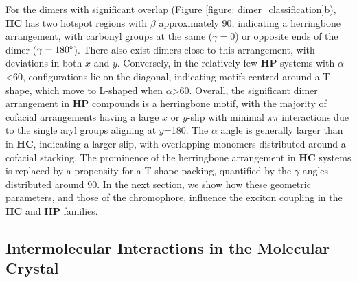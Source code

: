 For the dimers with significant overlap (Figure \ref{figure: dimer_classification}b), \textbf{HC} has two hotspot regions with $\beta$ approximately 90\degree, indicating a herringbone arrangement, with carbonyl groups at the same ($\gamma=$0\degree) or opposite ends of the dimer ($\gamma=180\degree$). There also exist dimers close to this arrangement, with deviations in both $x$ and $y$. Conversely, in the relatively few \textbf{HP} systems with  $\alpha$\textless{60}, configurations lie on the diagonal, indicating motifs centred around a T-shape, which move to L-shaped when $\alpha$\textgreater{60}. Overall, the significant dimer arrangement in \textbf{HP} compounds is a herringbone motif, with the majority of cofacial arrangements having a large $x$ or $y$-slip with minimal $\pi\pi$ interactions due to the single aryl groups aligning at $y$=180\degree. The $\alpha$ angle is generally larger than in \textbf{HC}, indicating a larger slip, with overlapping monomers distributed around a cofacial stacking. The prominence of the herringbone arrangement in \textbf{HC} systems is replaced by a propensity for a T-shape packing, quantified by the $\gamma$ angles distributed around 90\degree. In the next section, we show how these geometric parameters, and those of the chromophore, influence the exciton coupling in the \textbf{HC} and \textbf{HP} families.
\subsection{Intermolecular Interactions in the Molecular Crystal}\label{section: Connecting_Interactions}

